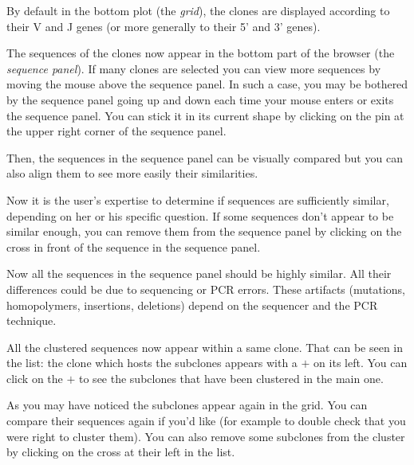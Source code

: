\documentclass[10pt]{article}
\begin{document}
By default in the bottom plot (the \textit{grid}), the clones
  are displayed according to their V and J genes (or more generally to their
  5' and 3' genes). 


The sequences of the clones now appear in the bottom part of the browser (the
\textit{sequence panel}). If many clones are selected you can view more sequences
by moving the mouse above the sequence panel.
\new In such a case, you may be bothered by the sequence panel going up and
down each time your mouse enters or exits the sequence panel. You can stick it
in its current shape by clicking on the pin at the upper right corner of the
sequence panel.

Then, the sequences in the sequence panel can be visually compared but you can also align
them to see more easily their similarities.



Now it is the user's expertise to determine if sequences are sufficiently
similar, depending on her or his specific question. If some sequences don't appear to be similar enough, you can remove
them from the sequence panel by clicking on the cross in front of the sequence in
the sequence panel.

Now all the sequences in the sequence panel should be highly similar. All their
differences could be due to sequencing or PCR errors.
These artifacts (mutations, homopolymers, insertions, deletions)
depend on the sequencer and the PCR technique.


All the clustered sequences now appear within a same clone. That can be seen
in the list: the clone which hosts the subclones appears with a $+$ on its
left. You can click on the $+$ to see the subclones that have been clustered in
the main one.

As you may have noticed the subclones appear again in the grid. You can
compare their sequences again if you'd like (for example to double check that
you were right to cluster them). You can also remove some subclones from the
cluster by clicking on the cross at their left in the list.
\end{document}
